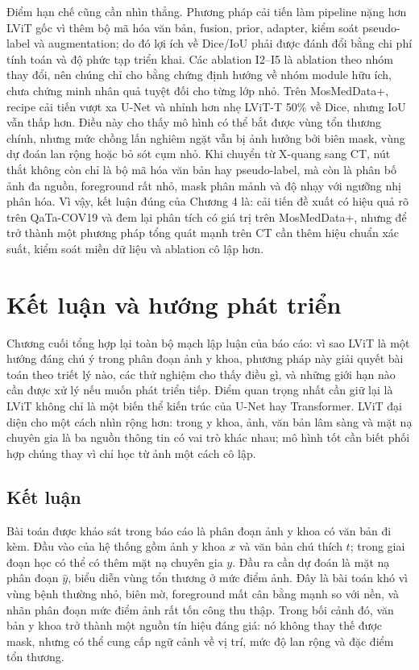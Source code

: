 Điểm hạn chế cũng cần nhìn thẳng. Phương pháp cải tiến làm pipeline nặng hơn LViT gốc vì thêm bộ mã hóa văn bản, fusion, prior, adapter, kiểm soát pseudo-label và augmentation; do đó lợi ích về Dice/IoU phải được đánh đổi bằng chi phí tính toán và độ phức tạp triển khai. Các ablation I2--I5 là ablation theo nhóm thay đổi, nên chúng chỉ cho bằng chứng định hướng về nhóm module hữu ích, chưa chứng minh nhân quả tuyệt đối cho từng lớp nhỏ. Trên MosMedData+, recipe cải tiến vượt xa U-Net và nhỉnh hơn nhẹ LViT-T 50\% về Dice, nhưng IoU vẫn thấp hơn. Điều này cho thấy mô hình có thể bắt được vùng tổn thương chính, nhưng mức chồng lấn nghiêm ngặt vẫn bị ảnh hưởng bởi biên mask, vùng dự đoán lan rộng hoặc bỏ sót cụm nhỏ. Khi chuyển từ X-quang sang CT, nút thắt không còn chỉ là bộ mã hóa văn bản hay pseudo-label, mà còn là phân bố ảnh đa nguồn, foreground rất nhỏ, mask phân mảnh và độ nhạy với ngưỡng nhị phân hóa. Vì vậy, kết luận đúng của Chương 4 là: cải tiến đề xuất có hiệu quả rõ trên QaTa-COV19 và đem lại phân tích có giá trị trên MosMedData+, nhưng để trở thành một phương pháp tổng quát mạnh trên CT cần thêm hiệu chuẩn xác suất, kiểm soát miền dữ liệu và ablation cô lập hơn.

\chapter{Kết luận và hướng phát triển}
\label{sec:conclusion}

Chương cuối tổng hợp lại toàn bộ mạch lập luận của báo cáo: vì sao LViT là một hướng đáng chú ý trong phân đoạn ảnh y khoa, phương pháp này giải quyết bài toán theo triết lý nào, các thử nghiệm cho thấy điều gì, và những giới hạn nào cần được xử lý nếu muốn phát triển tiếp. Điểm quan trọng nhất cần giữ lại là LViT không chỉ là một biến thể kiến trúc của U-Net hay Transformer. LViT đại diện cho một cách nhìn rộng hơn: trong y khoa, ảnh, văn bản lâm sàng và mặt nạ chuyên gia là ba nguồn thông tin có vai trò khác nhau; mô hình tốt cần biết phối hợp chúng thay vì chỉ học từ ảnh một cách cô lập.

\section{Kết luận}

Bài toán được khảo sát trong báo cáo là phân đoạn ảnh y khoa có văn bản đi kèm. Đầu vào của hệ thống gồm ảnh y khoa \(x\) và văn bản chú thích \(t\); trong giai đoạn học có thể có thêm mặt nạ chuyên gia \(y\). Đầu ra cần dự đoán là mặt nạ phân đoạn \(\hat{y}\), biểu diễn vùng tổn thương ở mức điểm ảnh. Đây là bài toán khó vì vùng bệnh thường nhỏ, biên mờ, foreground mất cân bằng mạnh so với nền, và nhãn phân đoạn mức điểm ảnh rất tốn công thu thập. Trong bối cảnh đó, văn bản y khoa trở thành một nguồn tín hiệu đáng giá: nó không thay thế được mask, nhưng có thể cung cấp ngữ cảnh về vị trí, mức độ lan rộng và đặc điểm tổn thương.

